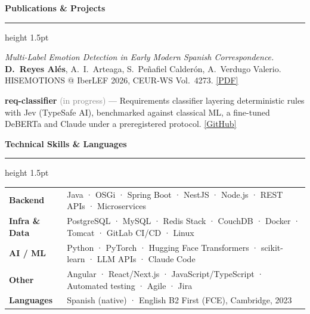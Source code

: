 \documentclass[9.5pt, a4paper]{article}
\newcommand{\cvsection}[1]{%
    \vspace{0.2cm}
    {\large \textbf{\textcolor{primary}{#1}}}
    \vspace{0.05cm}
    \textcolor{accent}{\hrule height 1.5pt}
    \vspace{0.1cm}
}
\begin{document}
\cvsection{Publications \& Projects}

\noindent \textit{Multi-Label Emotion Detection in Early Modern Spanish Correspondence.} \textbf{D.~Reyes Alés}, A.~I.~Arteaga, S.~Peñafiel Calderón, A.~Verdugo Valerio. HISEMOTIONS @ IberLEF 2026, CEUR-WS Vol.~4273. \href{https://ceur-ws.org/Vol-4273/HISEMOTIONS_paper7.pdf}{[PDF]}

\vspace{0.1cm}
\noindent \textbf{req-classifier} \textcolor{gray}{(in progress)} — Requirements classifier layering deterministic rules with Jev (TypeSafe AI), benchmarked against classical ML, a fine-tuned DeBERTa and Claude under a preregistered protocol. \href{https://github.com/davra02/req-classifier}{[GitHub]}

\cvsection{Technical Skills \& Languages}

\begin{tabularx}{\textwidth}{lX}
    \textbf{\textcolor{primary}{Backend}} &
    Java · OSGi · Spring Boot · NestJS · Node.js · REST APIs · Microservices \\[3pt]

    \textbf{\textcolor{primary}{Infra \& Data}} &
    PostgreSQL · MySQL · Redis Stack · CouchDB · Docker · Tomcat · GitLab CI/CD · Linux \\[3pt]

    \textbf{\textcolor{primary}{AI / ML}} &
    Python · PyTorch · Hugging Face Transformers · scikit-learn · LLM APIs · Claude Code \\[3pt]

    \textbf{\textcolor{primary}{Other}} &
    Angular · React/Next.js · JavaScript/TypeScript · Automated testing · Agile · Jira \\[3pt]

    \textbf{\textcolor{primary}{Languages}} &
    Spanish (native) · English B2 First (FCE), Cambridge, 2023 \\
\end{tabularx}
\end{document}
